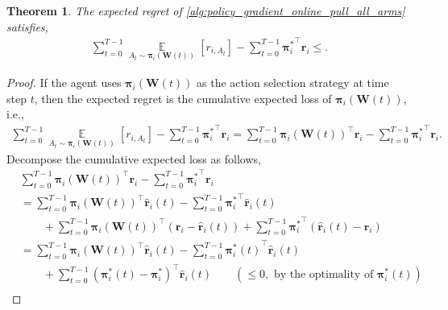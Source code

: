 \documentclass[10pt]{article}
\def\rvr{{\mathbf{r}}}
\newtheorem{thm}{Theorem}
\def\rvpi{{\boldsymbol{\pi}}}
\def\rmW{{\mathbf{W}}}
\def\sE{{\mathbb{E}}}
\DeclareMathOperator*{\expectation}{\sE}
\begin{document}
\begin{thm}
\label{thm:sublinear_online_update_pull_all_arms}
    The expected regret of \cref{alg:policy_gradient_online_pull_all_arms} satisfies,
\begin{equation*}
\begin{split}
    \sum\limits_{t=0}^{T-1}{ \expectation\limits_{A_t \sim \rvpi_i\left(\rmW(t)\right)} \left[ r_{i, A_t} \right] } - \sum\limits_{t=0}^{T-1}{ {\rvpi_i^*}^\top \rvr_i } \le .
\end{split}
\end{equation*}
\end{thm}
\begin{proof}
    If the agent uses $\rvpi_{i}\left(\rmW(t)\right)$ as the action selection strategy at time step $t$, then the expected regret is the cumulative expected loss of $\rvpi_{i}\left(\rmW(t)\right)$, i.e.,
\begin{equation*}
\begin{split}
    \sum\limits_{t=0}^{T-1}{ \expectation\limits_{A_t \sim \rvpi_i\left(\rmW(t)\right)} \left[ r_{i, A_t} \right] } - \sum\limits_{t=0}^{T-1}{ {\rvpi_i^*}^\top \rvr_i } = \sum\limits_{t=0}^{T-1}{\rvpi_i\left(\rmW(t)\right)^\top \rvr_i} - \sum\limits_{t=0}^{T-1}{ {\rvpi_i^*}^\top \rvr_i }.
\end{split}
\end{equation*}
    Decompose the cumulative expected loss as follows,
\begin{equation}
\label{eq:cumulative_expected_loss_decomposition}
\begin{split}
    &\sum\limits_{t=0}^{T-1}{\rvpi_i\left(\rmW(t)\right)^\top \rvr_i} - \sum\limits_{t=0}^{T-1}{ {\rvpi_i^*}^\top \rvr_i } \\
    &= \sum\limits_{t=0}^{T-1}{ \rvpi_i\left(\rmW(t)\right)^\top \hat{\rvr}_i(t)} - \sum\limits_{t=0}^{T-1}{ {\rvpi_i^*}^\top \hat{\rvr}_i(t)} \\
    &\qquad + \sum\limits_{t=0}^{T-1}{ \rvpi_i\left(\rmW(t)\right)^\top \left( \rvr_i - \hat{\rvr}_i(t) \right) } + \sum\limits_{t=0}^{T-1}{ {\rvpi_i^*}^\top \left( \hat{\rvr}_i(t) - \rvr_i \right) } \\
    &= \sum\limits_{t=0}^{T-1}{ \rvpi_i\left(\rmW(t)\right)^\top \hat{\rvr}_i(t)} - \sum\limits_{t=0}^{T-1}{ {\rvpi_i^*(t)}^\top \hat{\rvr}_i(t)} \\
    &\qquad + \sum\limits_{t=0}^{T-1}{ \left( {\rvpi_i^*(t)} - {\rvpi_i^*} \right)^\top \hat{\rvr}_i(t) } \qquad \left( \le 0, \text{ by the optimality of } {\rvpi_i^*(t)} \right) \\

\end{split}
\end{equation}
\end{proof}
\end{document}

